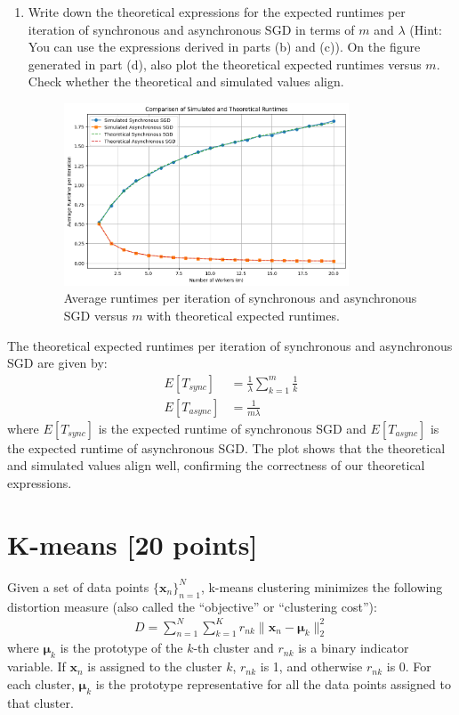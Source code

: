 \documentclass[a3paper,12pt]{extarticle} %
\begin{document}
\begin{enumerate}
\item
Write down the theoretical expressions for the expected runtimes per iteration of synchronous and asynchronous SGD in terms of $m$ and $\lambda$ (Hint: You can use the expressions derived in parts (b) and (c)). On the figure generated in part (d), also plot the theoretical expected runtimes versus $m$. Check whether the theoretical and simulated values align.
\begin{figure}
\centering
\includegraphics[width=0.8\textwidth]{theoriticalVPlotted.png}
\caption{Average runtimes per iteration of synchronous and asynchronous SGD versus $m$ with theoretical expected runtimes.}
\end{figure}
\end{enumerate}
The theoretical expected runtimes per iteration of synchronous and asynchronous SGD are given by:
\begin{align}
E[T_{sync}] &= \frac{1}{\lambda} \sum_{k=1}^m \frac{1}{k}\\
E[T_{async}] &= \frac{1}{m\lambda}
\end{align}
where $E[T_{sync}]$ is the expected runtime of synchronous SGD and $E[T_{async}]$ is the expected runtime of asynchronous SGD. The plot shows that the theoretical and simulated values align well, confirming the correctness of our theoretical expressions.

\newpage
\section{K-means [20 points]}

Given a set of data points $\{\mathbf{x}_n\}_{n=1}^N$, k-means clustering minimizes the following distortion measure (also called the ``objective'' or ``clustering cost''):
\begin{align}
D = \sum_{n=1}^N \sum_{k=1}^K r_{nk} \|\mathbf{x}_n - \boldsymbol{\mu}_k\|^2_2
\end{align}
where $\boldsymbol{\mu}_k$ is the prototype of the $k$-th cluster and $r_{nk}$ is a binary indicator variable. If $\mathbf{x}_n$ is assigned to the cluster $k$, $r_{nk}$ is 1, and otherwise $r_{nk}$ is 0. For each cluster, $\boldsymbol{\mu}_k$ is the prototype representative for all the data points assigned to that cluster.
\end{document}
